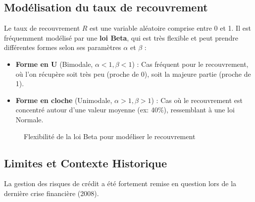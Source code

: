 \subsection{Modélisation du taux de recouvrement}

Le taux de recouvrement $R$ est une variable aléatoire comprise entre 0 et 1. Il est fréquemment modélisé par une \textbf{loi Beta}, qui est très flexible et peut prendre différentes formes selon ses paramètres $\alpha$ et $\beta$ :
\begin{itemize}
    \item \textbf{Forme en U} (Bimodale, $\alpha < 1, \beta < 1$) : Cas fréquent pour le recouvrement, où l'on récupère soit très peu (proche de 0), soit la majeure partie (proche de 1).
    \item \textbf{Forme en cloche} (Unimodale, $\alpha > 1, \beta > 1$) : Cas où le recouvrement est concentré autour d'une valeur moyenne (ex: 40\%), ressemblant à une loi Normale.
\end{itemize}

\begin{figure}[H]
    \centering
    \caption{Flexibilité de la loi Beta pour modéliser le recouvrement}
\end{figure}

\subsection{Limites et Contexte Historique}

La gestion des risques de crédit a été fortement remise en question lors de la dernière crise financière (2008). 

